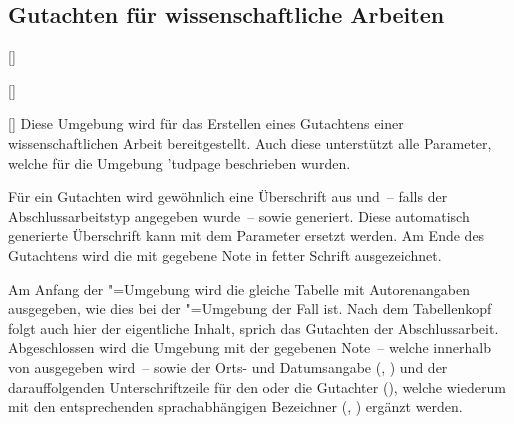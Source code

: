 \subsection{Gutachten für wissenschaftliche Arbeiten}
\begin{Declaration}{[]}{%
}
\begin{Declaration}{%
  []%
}
\begin{Declaration}{[]}
\printdeclarationlist%
%
%
Diese Umgebung wird für das Erstellen eines Gutachtens einer wissenschaftlichen 
Arbeit bereitgestellt. Auch diese unterstützt alle Parameter, welche für die 
Umgebung \Environment'{tudpage} beschrieben wurden.

Für ein Gutachten wird gewöhnlich eine Überschrift aus  
und~-- falls der Abschlussarbeitstyp angegeben wurde~--  
sowie  generiert. Diese automatisch generierte Überschrift kann 
mit dem Parameter  ersetzt werden. Am 
Ende des Gutachtens wird die mit  
gegebene Note in fetter Schrift ausgezeichnet.

Am Anfang der "=Umgebung wird die gleiche Tabelle mit 
Autorenangaben ausgegeben, wie dies bei der "=Umgebung der 
Fall ist. Nach dem Tabellenkopf folgt auch hier der eigentliche Inhalt, sprich 
das Gutachten der Abschlussarbeit. Abgeschlossen wird die Umgebung mit der 
gegebenen Note~-- welche innerhalb von  ausgegeben wird~-- 
sowie der Orts- und Datumsangabe (, ) und der 
darauffolgenden Unterschriftzeile für den oder die Gutachter (), 
welche wiederum mit den entsprechenden sprachabhängigen Bezeichner 
(, ) ergänzt werden.
\end{Declaration}
\end{Declaration}
\end{Declaration}


